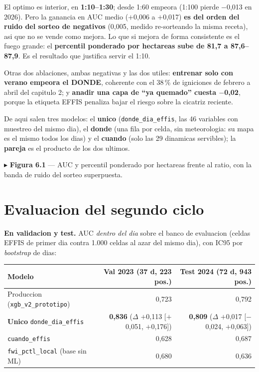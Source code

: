 \documentclass[10pt,a4paper]{article}
\newcommand{\var}[1]{\texttt{\footnotesize #1}}
\newcommand{\fig}[2]{{\color{blue}\footnotesize$\blacktriangleright$ \textbf{#1} --- #2\par}}
\begin{document}
El optimo es interior, en \textbf{1:10--1:30}; desde 1:60 empeora (1:100 pierde $-$0,013 en 2026).
Pero la ganancia en AUC medio ($+$0,006 a $+$0,017) \textbf{es del orden del ruido del sorteo de
negativos} (0,005, medido re-sorteando la misma receta), asi que no se vende como mejora. Lo que
si mejora de forma consistente es el fuego grande: el \textbf{percentil ponderado por hectareas
sube de 81,7 a 87,6--87,9}. Es el resultado que justifica servir el 1:10.

Otras dos ablaciones, ambas negativas y las dos utiles: \textbf{entrenar solo con verano empeora el
DONDE}, coherente con el 38\,\% de igniciones de febrero a abril del capitulo 2; y \textbf{anadir
una capa de ``ya quemado'' cuesta $-$0,02}, porque la etiqueta EFFIS penaliza bajar el riesgo sobre
la cicatriz reciente.

De aqui salen tres modelos: el \textbf{unico} (\var{donde\_dia\_effis}, las 46 variables con
muestreo del mismo dia), el \textbf{donde} (una fila por celda, sin meteorologia: su mapa es el
mismo todos los dias) y el \textbf{cuando} (solo las 29 dinamicas servibles); la \textbf{pareja} es
el producto de los dos ultimos.

\fig{Figura 6.1}{AUC y percentil ponderado por hectareas frente al ratio, con la banda de ruido del
sorteo superpuesta.}

\section{Evaluacion del segundo ciclo}

\textbf{En validacion y test.} AUC \emph{dentro del dia} sobre el banco de evaluacion (celdas EFFIS
de primer dia contra 1.000 celdas al azar del mismo dia), con IC95 por \emph{bootstrap} de dias:

\begin{center}\footnotesize
\begin{tabular}{@{}lrr@{}}
\toprule
\textbf{Modelo} & \textbf{Val 2023} (37 d, 223 pos.) & \textbf{Test 2024} (72 d, 943 pos.) \\
\midrule
Produccion (\var{xgb\_v2\_prototipo}) & 0,723 & 0,792 \\
\textbf{Unico} \var{donde\_dia\_effis} & \textbf{0,836} ($\Delta$ $+$0,113 [$+$0,051, $+$0,176]) & \textbf{0,809} ($\Delta$ $+$0,017 [$-$0,024, $+$0,063]) \\
\var{cuando\_effis} & 0,628 & 0,687 \\
\var{fwi\_pctl\_local} (base sin ML) & 0,680 & 0,636 \\
\bottomrule
\end{tabular}
\end{center}
\end{document}
